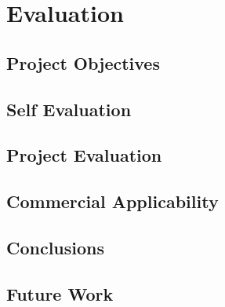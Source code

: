 \chapter{Evaluation}

\section{Project Objectives}

\section{Self Evaluation}

\section{Project Evaluation}

\section{Commercial Applicability}

\section{Conclusions}

\section{Future Work}
